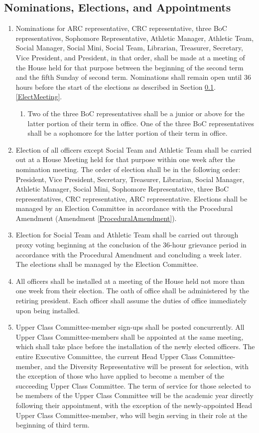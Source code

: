 \documentclass[10pt]{article} %
\begin{document}
\subsection{Nominations, Elections, and Appointments}
\label{NomsElects}
\begin{enumerate}
\item Nominations for ARC representative, CRC representative, three BoC representatives, Sophomore Representative, Athletic Manager, Athletic Team, Social Manager, Social Mini, Social Team, Librarian, Treasurer, Secretary, Vice President, and President, in that order, shall be made at a meeting of the House held for that purpose between the beginning of the second term and the fifth Sunday of second term. Nominations shall remain open until 36 hours before the start of the elections as described in Section \ref{NomsElects}.\ref{ElectMeeting}.
\begin{enumerate}
	\item Two of the three BoC representatives shall be a junior or above for the latter portion of their term in office. One of the three BoC representatives shall be a sophomore for the latter portion of their term in office.
\end{enumerate}
\item \label{ElectMeeting} Election of all officers except Social Team and Athletic Team shall be carried out at a House Meeting held for that purpose within one week after the nomination meeting. The order of election shall be in the following order: President, Vice President, Secretary, Treasurer, Librarian, Social Manager, Athletic Manager, Social Mini, Sophomore Representative, three BoC representatives, CRC representative, ARC representative. Elections shall be managed by an Election Committee in accordance with the Procedural Amendment (Amendment \ref{ProceduralAmendment}).
\item Election for Social Team and Athletic Team shall be carried out through proxy voting beginning at the conclusion of the 36-hour grievance period in accordance with the Procedural Amendment and concluding a week later. The elections shall be managed by the Election Committee.
\item All officers shall be installed at a meeting of the House held not more than one week from their election. The oath of office shall be administered by the retiring president. Each officer shall assume the duties of office immediately upon being installed.
\item Upper Class Committee-member sign-ups shall be posted concurrently. All Upper Class Committee-members shall be appointed at the same meeting, which shall take place before the installation of the newly elected officers. The entire Executive Committee, the current Head Upper Class Committee-member, and the Diversity Representative will be present for selection, with the exception of those who have applied to become a member of the succeeding Upper Class Committee. The term of service for those selected to be members of the Upper Class Committee will be the academic year directly following their appointment, with the exception of the newly-appointed Head Upper Class Committee-member, who will begin serving in their role at the beginning of third term.

\end{enumerate}
\end{document}
